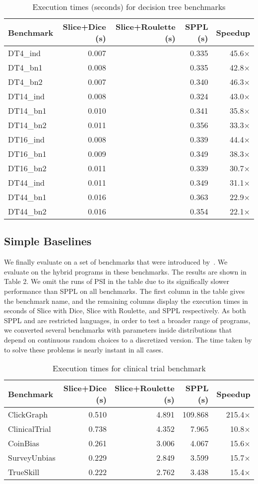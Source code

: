 \begin{table}[!t]
\centering
\begin{tabular}{lrrrr}
\toprule
Benchmark & Slice+Dice (s) & Slice+Roulette (s) & SPPL (s) & Speedup \\
\midrule
DT4\_ind & 0.007 & & 0.335 & 45.6× \\
DT4\_bn1 & 0.008 & & 0.335 & 42.8× \\
DT4\_bn2 & 0.007 & & 0.340 & 46.3× \\
DT14\_ind & 0.008 & & 0.324 & 43.0× \\
DT14\_bn1 & 0.010 & & 0.341 & 35.8× \\
DT14\_bn2 & 0.011 & & 0.356 & 33.3× \\
DT16\_ind & 0.008 & & 0.339 & 44.4× \\
DT16\_bn1 & 0.009 & & 0.349 & 38.3× \\
DT16\_bn2 & 0.011 & & 0.339 & 30.7× \\
DT44\_ind & 0.011 & & 0.349 & 31.1× \\
DT44\_bn1 & 0.016 & & 0.363 & 22.9× \\
DT44\_bn2 & 0.016 & & 0.354 & 22.1× \\
\bottomrule
\end{tabular}
\caption{Execution times (seconds) for decision tree benchmarks}
\end{table}

\subsection{Simple Baselines}
We finally evaluate \Slice{} on a set of benchmarks that were introduced by~\cite{gehr2016psi}. We evaluate \Slice{} on the hybrid programs in these benchmarks. The results are shown in Table 2. We omit the runs of PSI in the table due to its significally slower performance than SPPL on all benchmarks. The first column in the table gives the benchmark name, and the remaining columns display the execution times in seconds of Slice with Dice, Slice with Roulette, and SPPL respectively. As both SPPL and \Slice{} are restricted languages, in order to test a broader range of programs, we converted several benchmarks with parameters inside distributions that depend on continuous random choices to a discretized version. The time taken by \Slice{} to solve these problems is nearly instant in all cases. 

\begin{table}[!t]
\centering
\begin{tabular}{lrrrr}
\toprule
Benchmark & Slice+Dice (s) & Slice+Roulette (s) & SPPL (s) & Speedup \\
\midrule
ClickGraph & 0.510 & 4.891 & 109.868 & 215.4× \\
ClinicalTrial & 0.738 & 4.352 & 7.965 & 10.8× \\
CoinBias & 0.261 & 3.006 & 4.067 & 15.6× \\
SurveyUnbias & 0.229 & 2.849 & 3.599 & 15.7× \\
TrueSkill & 0.222 & 2.762 & 3.438 & 15.4× \\
\bottomrule
\end{tabular}
\caption{Execution times for clinical trial benchmark}
\end{table}